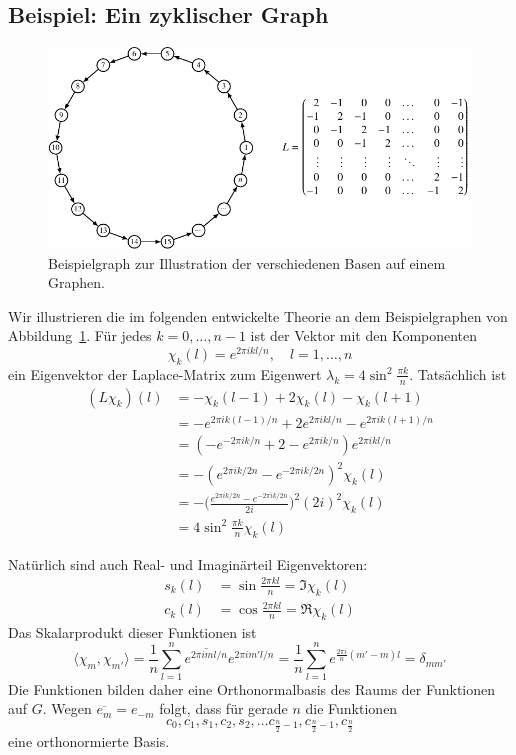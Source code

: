 \subsection{Beispiel: Ein zyklischer Graph
\label{buch:graphen:subsection:zyklischer-graph}}
\begin{figure}
\centering
\includegraphics{chapters/70-graphen/images/kreis.pdf}
\caption{Beispielgraph zur Illustration der verschiedenen Basen auf einem
Graphen.
\label{buch:graphen:fig:kreis}}
\end{figure}
Wir illustrieren die im folgenden entwickelte Theorie an dem Beispielgraphen
von Abbildung~\ref{buch:graphen:fig:kreis}.
Für jedes $k=0,\dots,n-1$ ist der Vektor mit den Komponenten
\[
\chi_k(l) = e^{2\pi ikl/n}, \quad l=1,\dots,n
\]
ein Eigenvektor der Laplace-Matrix zum Eigenwert
$\lambda_k=4\sin^2\frac{\pi k}{n}$.
Tatsächlich ist
\begin{align*}
(L\chi_k)(l)
&=
-\chi_k(l-1)
+
2\chi_k(l)
-
\chi_k(l+1)
\\
&=
-e^{2\pi ik(l-1)/n}
+
2e^{2\pi ikl/n}
-
e^{2\pi ik(l+1)/n}
\\
&=
(-e^{-2\pi ik/n}+2-e^{2\pi ik/n})e^{2\pi ikl/n}
\\
&=
-(e^{2\pi ik/2n}-e^{-2\pi ik/2n})^2 \chi_k(l)
\\
&=
-
\biggl(
\frac{e^{2\pi ik/2n}-e^{-2\pi ik/2n}}{2i}
\biggr)^2
(2i)^2 \chi_k(l)
\\
&=
4\sin^2\frac{\pi k}n \chi_k(l)
\end{align*}

Natürlich sind auch Real- und Imaginärteil Eigenvektoren:
\[
\begin{aligned}
s_k(l)
&=
\sin\frac{2\pi kl}{n}
=
\Im \chi_k(l)
\\
c_k(l)
&=
\cos\frac{2\pi kl}{n}
=
\Re\chi_k(l)
\end{aligned}
\]
Das Skalarprodukt dieser Funktionen ist
\[
\langle \chi_m, \chi_{m'}\rangle
=
\frac1n
\sum_{l=1}^n
\overline{e^{2\pi i ml/n}}
e^{2\pi im'l/n}
=
\frac1n
\sum_{l=1}^n
e^{\frac{2\pi i}{n}(m'-m)l}
=
\delta_{mm'}
\]
Die Funktionen bilden daher eine Orthonormalbasis des Raums der
Funktionen auf $G$.
Wegen $\overline{e_m} = e_{-m}$ folgt, dass für gerade $n$
die Funktionen
\[
c_0, c_1,s_1,c_2,s_2,\dots c_{\frac{n}2-1},c_{\frac{n}2-1},c_{\frac{n}2}
\]
eine orthonormierte Basis.

